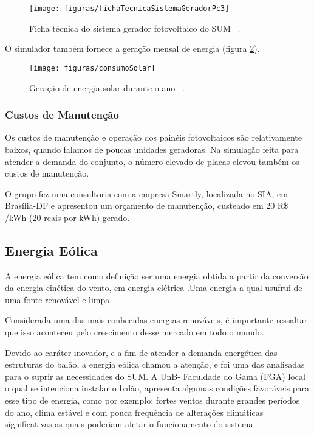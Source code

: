 \begin{figure}[H]
	\centering
	\caption{Ficha técnica do sistema gerador fotovoltaico do SUM ~\cite{simulador}.}
	\texttt{[image: figuras/fichaTecnicaSistemaGeradorPc3]}
	\label{img:Gerador}
\end{figure}

O simulador também fornece a geração mensal de energia (figura \ref{img:Geracao de energia solar}).

\begin{figure}[htp]
	\centering
	\caption{Geração de energia solar durante o ano ~\cite{simulador}.}
	\texttt{[image: figuras/consumoSolar]}
	\label{img:Geracao de energia solar}
\end{figure}

\subsubsection{Custos de Manutenção}

Os custos de manutenção e operação dos painéis fotovoltaicos são relativamente baixos, quando falamos de poucas unidades geradoras. Na simulação feita para atender a demanda do conjunto, o número elevado de placas elevou também os custos de manutenção.

O grupo fez uma consultoria com a empresa \href{http://www.smartly.com.br}{Smartly}, localizada no SIA, em Brasília-DF e apresentou um orçamento de manutenção, custeado em 20 R\$ /kWh (20 reais por kWh) gerado.

\subsection{Energia Eólica}

A energia eólica  tem como definição ser uma energia obtida a partir da conversão da energia cinética do vento, em energia elétrica .Uma energia a qual usufrui de uma fonte renovável e limpa.

Considerada uma das mais conhecidas energias renováveis, é importante ressaltar que isso aconteceu pelo crescimento desse mercado em todo o mundo\cite{renovaveis}.

Devido ao caráter inovador, e a fim de atender a demanda energética das estruturas do balão, a energia eólica chamou a atenção, e foi uma das analisadas para o suprir as necessidades do SUM. A UnB- Faculdade do Gama (FGA) local o qual se intenciona instalar o balão, apresenta algumas condições favoráveis para esse tipo de energia, como por exemplo: fortes ventos durante grandes períodos do ano, clima estável e com pouca frequência de alterações climáticas significativas as quais poderiam afetar o funcionamento do sistema.

